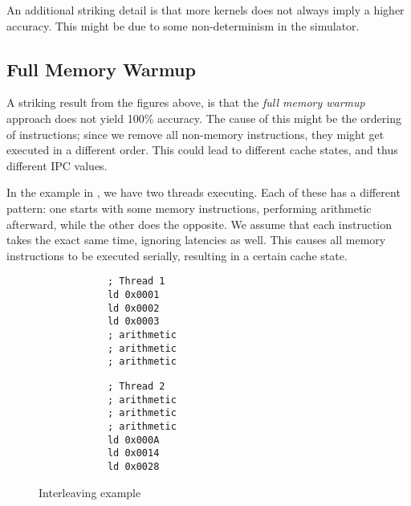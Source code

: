 An additional striking detail is that more kernels does not always imply a higher accuracy.
This might be due to some non-determinism in the simulator.

\FloatBarrier
\subsection{Full Memory Warmup}\label{subsec:full-memory-warmup}
A striking result from the figures above, is that the \textit{full memory warmup} approach does not yield 100\% accuracy.
The cause of this might be the ordering of instructions; since we remove all non-memory instructions, they might get executed in a different order.
This could lead to different cache states, and thus different IPC values.

In the example in , we have two threads executing.
Each of these has a different pattern: one starts with some memory instructions, performing arithmetic afterward, while the other does the opposite.
We assume that each instruction takes the exact same time, ignoring latencies as well.
This causes all memory instructions to be executed serially, resulting in a certain cache state.
\begin{figure}[hb]
    \centering
    \begin{minipage}[!]{0.45\textwidth}
        \begin{verbatim}
            ; Thread 1
            ld 0x0001
            ld 0x0002
            ld 0x0003
            ; arithmetic
            ; arithmetic
            ; arithmetic
        \end{verbatim}
    \end{minipage}
    \begin{minipage}[!]{0.45\textwidth}
        \begin{verbatim}
            ; Thread 2
            ; arithmetic
            ; arithmetic
            ; arithmetic
            ld 0x000A
            ld 0x0014
            ld 0x0028
        \end{verbatim}
    \end{minipage}
    \caption{Interleaving example}
    \label{fig:example2a}
\end{figure}


